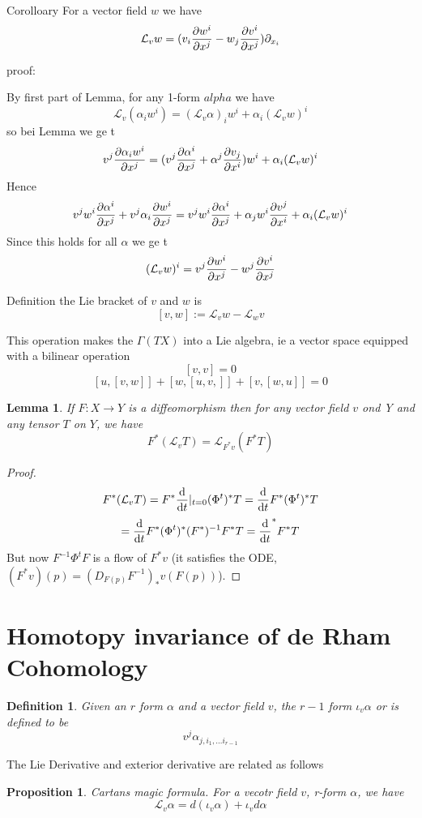 \documentclass{article}
\numberwithin{theorem}{section}
\newtheorem{lemma}[theorem]{Lemma}
\newtheorem{proposition}[theorem]{Proposition}
\newtheorem{definition}[theorem]{Definition}
\newcommand{\1}{\mathds{1}}
\begin{document}
Corolloary
For a vector field $w$ we have 
\[ \mathcal{L}_vw = (v_i \pdv{w^i}{x^j} - w_j \pdv{v^i}{x^j} )\partial_{x_i}\]

proof:

By first part of Lemma, for any 1-form $alpha$ we have 
\[ \mathcal{L}_v(\alpha_iw^i) = (\mathcal{L}_v\alpha)_i w^i + \alpha_i (\mathcal{L}_v w)^i \]
so bei Lemma we ge t
\[ v^j \pdv{\alpha_iw^i}{x^j} = (v^j \pdv{\alpha^i}{x^j} + \alpha^j\pdv{v_j}{x^i})w^i + \alpha_i (\mathcal{L}_v w)^i\]
Hence 
\[ v^jw^i \pdv{\alpha^i}{x^j} + v^j \alpha_i\pdv{w^i}{x^j} =  v^jw^i \pdv{\alpha^i}{x^j} + \alpha_jw^i \pdv{v^j}{x^i} + \alpha_i(\mathcal{L}_vw)^i \]
Since this holds for all $\alpha$ we ge t
\[ (\mathcal{L}_vw)^i = v^j \pdv{w^i}{x^j} - w^j\pdv{v^i}{x^j}\]

Definition 
the Lie bracket of $v$ and $w$ is 
\[ [v,w] := \mathcal{L}_vw - \mathcal{L}_wv \]

This operation makes the $\Gamma(TX)$ into a Lie algebra, ie a vector space equipped with a bilinear operation 
\[ [v,v] = 0\]
\[ [u, [v,w]] + [w,[u,v,]] + [v,[w,u]] = 0\]

\begin{lemma}
    If $F:X\to Y$ is a diffeomorphism then for any vector field $v$ ond Y and 
    any tensor $T$ on $Y$, we have 
    \[ F^*(\mathcal{L}_v T) = \mathcal{L}_{F^*v}(F^*T)\]
\end{lemma}
\begin{proof}
   \[ F^*(\mathcal{L}_vT) = F^* \dv{}{t}|_{t=0} (\Phi^t)^* T = \dv{}{t} F^*(\Phi^t)^* T \]
   \[  = \dv{}{t} F^*(\Phi^t)^* (F^*)^{-1} F^*T  = \dv{}{t} (F^{-1}\circ \Phi^t \circ F)^* F^*T\]
   But now $F^{-1}\Phi^t F$ is a flow of $F^*v$ (it satisfies the ODE, $(F^*v)(p) = (D_{F(p)}F^{-1})_*v(F(p))$). 
\end{proof}

\section{Homotopy invariance of de Rham Cohomology}

\begin{definition}
    Given an $r$ form $\alpha$ and a vector field $v$, the $r-1$ form 
    $\iota_v \alpha$ or is defined to be 
    \[ v^j \alpha_{j, i_1, \dots i_{r-1}}\]
\end{definition}
The Lie Derivative and exterior derivative are related as follows 

\begin{proposition}
    Cartans magic formula. For a vecotr field $v$, r-form $\alpha$, we have 
    \[ \mathcal{L}_v \alpha = d(\iota_v \alpha) + \iota_v d\alpha \]
\end{proposition}
\end{document}
